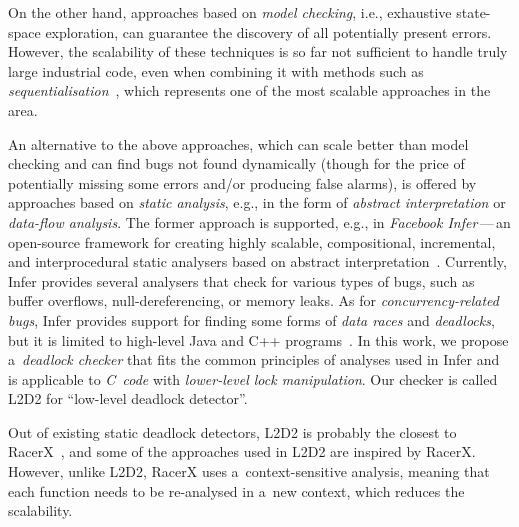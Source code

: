 \documentclass[runningheads]{llncs}
\begin{document}
On the other hand, approaches based on \emph{model checking}, i.e., exhaustive
state-space exploration, can guarantee the discovery of all potentially present
errors.
%
%
However, the scalability of these techniques is so far not sufficient to handle
truly large industrial code, even when combining it with methods such as
\emph{sequentialisation}~\cite{lazy-seq-16},
%
%
which represents one of the most scalable approaches in the area.

An alternative to the above approaches, which can scale better than model
checking and can find bugs not found dynamically (though for the price of
potentially missing some errors and/or producing false alarms), is offered by
approaches based on \emph{static analysis}, e.g., in the form of \emph{abstract
interpretation} or \emph{data-flow analysis}.
%
The former approach is supported, e.g., in \emph{Facebook Infer}\,---\,an
open-source framework for creating highly scalable, compositional, incremental,
and interprocedural static analysers based on abstract
interpretation~\cite{inferNFM15}.
%
%
%
Currently, Infer provides several analysers that check for various types of
bugs, such as buffer overflows, null-dereferencing, or memory leaks.
%
%
As for \emph{concurrency-related bugs}, Infer provides support for finding
some forms of \emph{data races} and \emph{deadlocks}, but it is limited to
high-level Java and C++ programs~\cite{racerD18,inferCACM19}.
%
In this work, we propose a~\emph{deadlock checker} that fits the common
principles of analyses used in Infer and is applicable to \emph{C~code} with
\emph{lower-level lock manipulation}.
%
Our checker is called L2D2 for ``low-level deadlock detector''.

\enlargethispage{6mm}

Out of existing static deadlock detectors, L2D2 is probably the closest to
\mbox{RacerX}~\cite{racerX03}, and some of the approaches used in L2D2 are
inspired by RacerX.
%
However, unlike L2D2, RacerX uses a~context-sensitive analysis, meaning that
each function needs to be re-analysed in a~new context, which reduces the
scalability.
\end{document}
